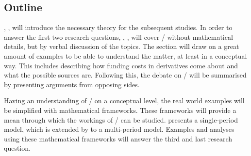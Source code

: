 \documentclass[main.tex]{subfiles}
\begin{document}
    \subsection{Outline}

    , , 
    will introduce the necessary theory for the subsequent studies.
    In order to answer the first two research questions,
    , , 
    will cover \FVA/ without mathematical details, but by verbal discussion of the topics.
    The section will draw on a great amount of examples to be able to understand the matter, 
    at least in a conceptual way.
    This includes describing how funding costs in derivatives come about 
    and what the possible sources are.
    Following this, the debate on \FVA/ will be summarised
    by presenting arguments from opposing sides.

    Having an understanding of \FVA/ on a conceptual level,
    the real world examples will be simplified with mathematical frameworks.
    These frameworks will provide a mean through which the workings of \FVA/ can be studied.
     presents a single-period model,
    which is extended by  to a multi-period model.
    Examples and analyses using these mathematical frameworks
    will answer the third and last research question.
\end{document}
